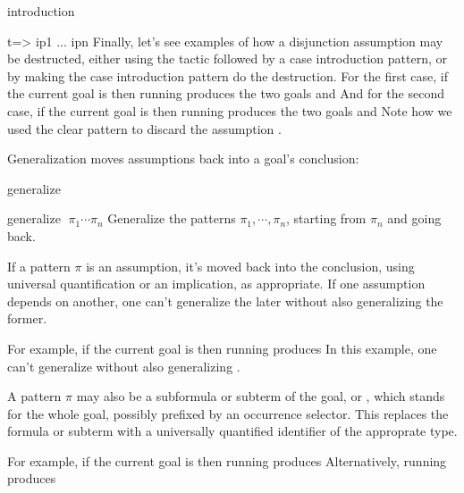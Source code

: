 \begin{tactic}[$t$ =>$\;\iota_1 \cdots \iota_n$]{introduction}
\begin{tsyntax}[empty]{t=> ip1 ... ipn}
    Finally, let's see examples of how a disjunction assumption
    may be destructed, either using the  tactic followed
    by a case introduction pattern, or by making the
    case introduction pattern do the destruction.
    For the first case, if the current goal is
    then running
    produces the two goals
    and
    And for the second case, if the current goal is
    then running
    produces the two goals
    and
    Note how we used the clear pattern to discard the assumption
    .
  \end{tsyntax}
\end{tactic}

Generalization moves assumptions back into a goal's conclusion:

\begin{tactic}{generalize}
  \begin{tsyntax}[empty]{generalize $\;\pi_1 \cdots \pi_n$}
    Generalize the patterns $\pi_1, \cdots, \pi_n$, starting from
    $\pi_n$ and going back.

    If a pattern $\pi$ is an assumption, it's moved back into the
    conclusion, using universal quantification or an implication,
    as appropriate. If one assumption depends on another, one can't
    generalize the later without also generalizing the former.

    For example, if the current goal is
    then running
    produces
    In this example, one can't generalize  without also
    generalizing .

    A pattern $\pi$ may also be a subformula or subterm of the goal,
    or \ec{_}, which stands for the whole goal, possibly prefixed by
    an occurrence selector. This replaces the formula or subterm
    with a universally quantified identifier of the approprate type.

    For example, if the current goal is
    then running
    produces
    Alternatively, running
    produces
  \end{tsyntax}
\end{tactic}

